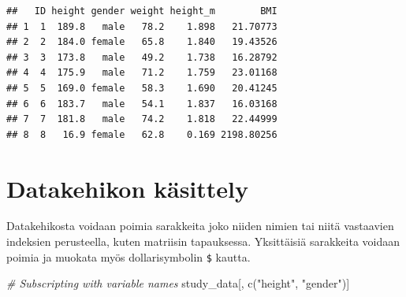 \documentclass[
]{book}
\newenvironment{Shaded}{\begin{snugshade}}{\end{snugshade}}
\newcommand{\CommentTok}[1]{\textcolor[rgb]{0.56,0.35,0.01}{\textit{#1}}}
\newcommand{\DecValTok}[1]{\textcolor[rgb]{0.00,0.00,0.81}{#1}}
\newcommand{\FloatTok}[1]{\textcolor[rgb]{0.00,0.00,0.81}{#1}}
\newcommand{\FunctionTok}[1]{\textcolor[rgb]{0.00,0.00,0.00}{#1}}
\newcommand{\NormalTok}[1]{#1}
\newcommand{\OtherTok}[1]{\textcolor[rgb]{0.56,0.35,0.01}{#1}}
\newcommand{\SpecialCharTok}[1]{\textcolor[rgb]{0.00,0.00,0.00}{#1}}
\newcommand{\StringTok}[1]{\textcolor[rgb]{0.31,0.60,0.02}{#1}}
\begin{document}
\begin{Shaded}
\end{Shaded}

\begin{verbatim}
##   ID height gender weight height_m        BMI
## 1  1  189.8   male   78.2    1.898   21.70773
## 2  2  184.0 female   65.8    1.840   19.43526
## 3  3  173.8   male   49.2    1.738   16.28792
## 4  4  175.9   male   71.2    1.759   23.01168
## 5  5  169.0 female   58.3    1.690   20.41245
## 6  6  183.7   male   54.1    1.837   16.03168
## 7  7  181.8   male   74.2    1.818   22.44999
## 8  8   16.9 female   62.8    0.169 2198.80256
\end{verbatim}

\hypertarget{datakehikon-kuxe4sittely}{%
\section{Datakehikon käsittely}\label{datakehikon-kuxe4sittely}}

Datakehikosta voidaan poimia sarakkeita joko niiden nimien tai niitä vastaavien indeksien perusteella, kuten matriisin tapauksessa. Yksittäisiä sarakkeita voidaan poimia ja muokata myös dollarisymbolin \texttt{\$} kautta.

\begin{Shaded}
\begin{Highlighting}[]
\CommentTok{\# Subscripting with variable names}
\NormalTok{study\_data[, }\FunctionTok{c}\NormalTok{(}\StringTok{"height"}\NormalTok{, }\StringTok{"gender"}\NormalTok{)]}
\end{Highlighting}
\end{Shaded}
\end{document}
